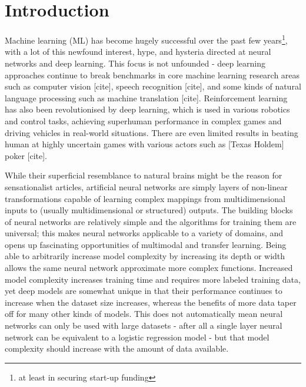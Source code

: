 \chapter{Introduction}


Machine learning (ML) has become hugely successful over the past few years\footnote{at least in securing start-up funding}, with a lot of this newfound interest, hype, and hysteria directed at  neural networks and deep learning. This focus is not unfounded - deep learning approaches continue to break benchmarks in  core machine learning research areas such as computer vision [cite], speech recognition [cite], and  some kinds of natural language processing  such as machine translation [cite].
Reinforcement learning has also been revolutionised by deep learning, which is used in various robotics and control tasks, achieving superhuman performance in complex games and driving vehicles in real-world situations.
There are even limited results in  beating human at highly uncertain games with various actors such as [Texas Holdem] poker [cite].

While their superficial resemblance to  natural brains might be the reason for sensationalist articles, artificial neural networks are simply layers of non-linear transformations capable of learning complex mappings from multidimensional inputs to (usually multidimensional or structured) outputs.
The building blocks of neural networks are relatively simple and the algorithms for training them are universal; this makes neural networks applicable to a variety of domains, and opens up fascinating opportunities of multimodal and transfer learning.
Being able to arbitrarily increase model complexity by increasing its depth or width allows the same neural network approximate more complex functions.
Increased model complexity increases training time and requires more labeled training data, yet deep models are somewhat unique in that their performance continues to increase when the dataset size increases, whereas the benefits of more data taper off for many other kinds of models.
This does not automatically mean neural networks can only be used with large datasets - after all a single layer neural network can be equivalent to a logistic regression model - but that model complexity should increase with the amount of data available.

